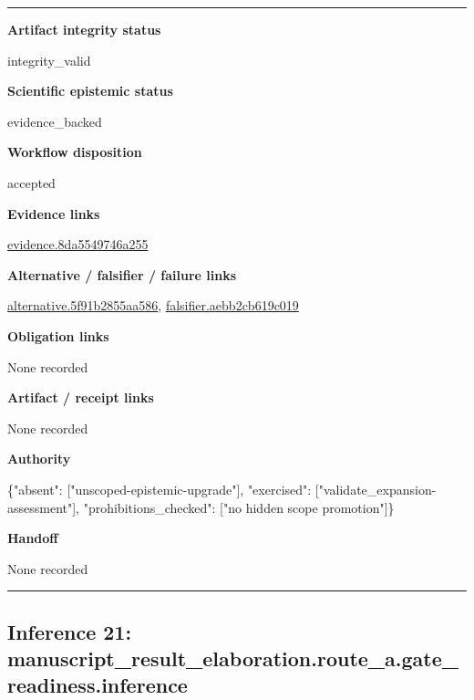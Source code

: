 \documentclass[10pt,a4paper]{article}
\newcommand{\TraceField}[2]{\par\noindent\textbf{#1}\par\noindent #2\par\smallskip}
\newenvironment{TraceDossier}{\par\medskip\noindent\hrule\medskip}{\medskip\hrule\par\medskip}
\begin{document}
\begin{TraceDossier}
\TraceField{Artifact integrity status}{integrity\_\allowbreak{}valid}

\TraceField{Scientific epistemic status}{evidence\_\allowbreak{}backed}

\TraceField{Workflow disposition}{accepted}

\TraceField{Evidence links}{\hyperlink{trace-evidence-3aa3909253a0bcc5d7}{evidence.\allowbreak{}8da5549746\allowbreak{}a255}}

\TraceField{Alternative / falsifier / failure links}{\hyperlink{trace-alternative-ae057335662751c165}{alternativ\allowbreak{}e.\allowbreak{}5f91b2855a\allowbreak{}a586}, \hyperlink{trace-alternative-9ec0beb43ca64fc3c6}{falsifier.\allowbreak{}aebb2cb619\allowbreak{}c019}}

\TraceField{Obligation links}{None recorded}

\TraceField{Artifact / receipt links}{None recorded}

\TraceField{Authority}{\{"absent":\allowbreak{} ["unscoped\allowbreak{}-\allowbreak{}epistemic-\allowbreak{}upgrade"],\allowbreak{} "exercised\allowbreak{}":\allowbreak{} ["validate\allowbreak{}\_\allowbreak{}expansion-\allowbreak{}assessment\allowbreak{}"], "prohibiti\allowbreak{}ons\_\allowbreak{}checked":\allowbreak{} ["no hidden scope promotion"\allowbreak{}]\}}

\TraceField{Handoff}{None recorded}

\end{TraceDossier}
\pagebreak[2]\subsection{Inference 21: manuscript\allowbreak{}\_\allowbreak{}result\_\allowbreak{}elaboratio\allowbreak{}n.\allowbreak{}route\_\allowbreak{}a.\allowbreak{}gate\_\allowbreak{}readiness.\allowbreak{}inference}\label{trace-inference-4b8b509c00b63a2406}
\end{document}
